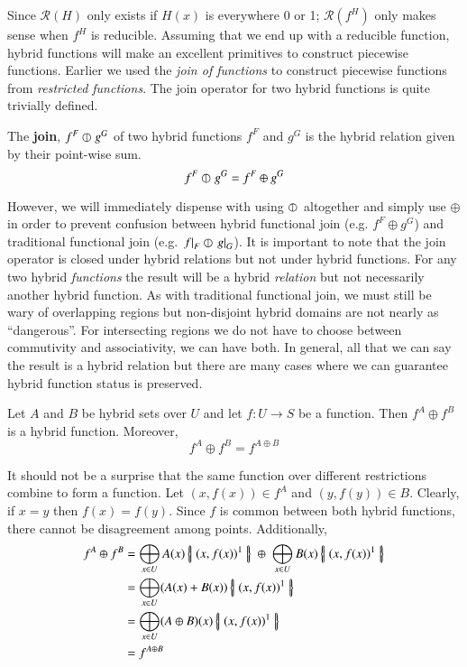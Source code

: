 Since $\mathcal{R}(H)$ only exists if $H(x)$ is everywhere 0 or 1; 
$\mathcal{R}(f^H)$ only makes sense when $f^H$ is reducible.
Assuming that we end up with a reducible function, 
hybrid functions will make an excellent primitives to construct piecewise functions.
Earlier we used the \emph{join of functions} to construct piecewise functions from \emph{restricted functions}.
The join operator for two hybrid functions is quite trivially defined.

 
\begin{definition}
	The \textbf{join}, $f^F \varobar^{} g^G$ of two hybrid functions $f^F$ and $g^G$ is 
	the hybrid relation given by their point-wise sum.
	\begin{equation} \label{def:hjoin}
		f^F \varobar^{} g^G = f^F \oplus g^G
	\end{equation}
\end{definition}


However, we will immediately dispense with using $\varobar^{}$ altogether and simply use $\oplus$ 
in order to prevent confusion between hybrid functional join (e.g. $f^F \oplus g^G$) and 
traditional functional join (e.g. $\left.f\right|_{F} \varobar \left.g\right|_{G}$).
It is important to note that the join operator is closed under hybrid relations but not under hybrid functions.
For any two hybrid \emph{functions} the result will be a hybrid \emph{relation} 
but not necessarily another hybrid function.
As with traditional functional join, we must still be wary of overlapping regions
 but non-disjoint hybrid domains are not nearly as ``dangerous''.
For intersecting regions we do not have to choose between commutivity and associativity, we can have both.
In general, all that we can say the result is a hybrid relation but there are many cases where we can guarantee hybrid function status is preserved.


\begin{theorem}
\label{thm:reducible1}
Let $A$ and $B$ be hybrid sets over $U$ and let $f: U \to S$ be a function.
Then $f^A \oplus f^B$ is a hybrid function.
Moreover,
	\begin{equation}
		f^A \oplus f^B = f^{A \oplus B}
	\end{equation}
\end{theorem}


It should not be a surprise that the same function over different restrictions combine to form a function.
Let $(x,f(x)) \in f^A$ and $(y,f(y)) \in B$. Clearly, if $x=y$ then $f(x)=f(y)$. 
Since $f$ is common between both hybrid functions, there cannot be disagreement among points.
Additionally,
\begin{align}
	f^A \oplus f^B 
		&= \bigoplus_{x \in U} A(x) \hset{ (x, f(x) )^1 } 
			\; \oplus \; \bigoplus_{x \in U} B(x) \hset{ (x, f(x) )^1 } \notag \\
		&= \bigoplus_{x \in U} (A(x) + B(x)) \hset{ (x, f(x) )^1 } \notag \\
		&= \bigoplus_{x \in U} (A \oplus B)(x) \hset{ (x, f(x) )^1 } \notag \\ 
		&= f^{A \oplus B}
\end{align}



